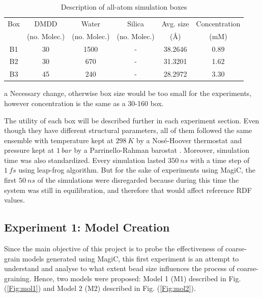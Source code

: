 \documentclass[10pt,a4paper,twoside]{article}
\begin{document}
\begin{table}[ht!] 
  \centering
\begin{threeparttable}

  \caption{Description of all-atom simulation boxes}

    \begin{tabular}{cccccc}
    \toprule
    Box &  DMDD &  Water & Silica & Avg. size & Concentration \\
	& (no. Molec.) & (no. Molec.) & (no. Molec.)  & (\AA) & (mM)\\
    \midrule
    B1   & 30  & 1500  & -  & 38.2646 & 0.89\\
    B2   & 30  & 670  & -   &  31.3201 & 1.62\\
    B3   & 45\tnote{a}  & 240  & -  & 28.2972 & 3.30\\
    \bottomrule
    \end{tabular}%
    \begin{tablenotes}
    	\item[a]Necessary change, otherwise box size would be too small for the experiments, however concentration is the same as a 30-160 box.
    \end{tablenotes}
  \label{tab:boxes}%
\end{threeparttable} 
\end{table}

The utility of each box will be described further in each experiment section. Even though they have different structural parameters, all of them followed the same ensemble with temperature kept at $298\ K$ by a Nosé-Hoover thermostat \cite{nosetstat} and pressure kept at $1\ bar$ by a Parrinello-Rahman barostat \cite{prbstat}. Moreover, simulation time was also standardized. Every simulation lasted $350\ ns$ with a time step of $1\ fs$ using leap-frog algorithm. But for the sake of experiments using MagiC, the first $50\ ns$ of the simulations were disregarded because during this time the system was still in equilibration, and therefore that would affect reference RDF values.


\subsection{Experiment 1: Model Creation}
 Since the main objective of this project is to probe the effectiveness of coarse-grain models generated using MagiC, this first experiment is an attempt to understand and analyse to what extent bead size influences the process of coarse-graining. Hence, two models were proposed: Model 1 (M1) described in Fig.(\ref{Fig:mol1}) and Model 2 (M2) described in Fig. (\ref{Fig:mol2}).
 
\end{document}
